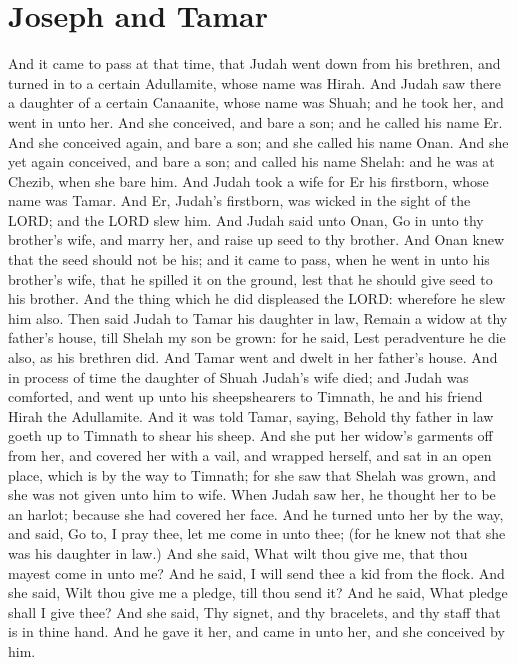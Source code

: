 \section*{Joseph and Tamar}
\begin{biblechapter} %
\verse And it came to pass at that time, that Judah went down from his brethren, and turned in to a certain Adullamite, whose name was Hirah.
\verse And Judah saw there a daughter of a certain Canaanite, whose name was Shuah; and he took her, and went in unto her.
\verse And she conceived, and bare a son; and he called his name Er.
\verse And she conceived again, and bare a son; and she called his name Onan.
\verse And she yet again conceived, and bare a son; and called his name Shelah: and he was at Chezib, when she bare him.
\verse And Judah took a wife for Er his firstborn, whose name was Tamar.
\verse And Er, Judah's firstborn, was wicked in the sight of the LORD; and the LORD slew him.
\verse And Judah said unto Onan, Go in unto thy brother's wife, and marry her, and raise up seed to thy brother.
\verse And Onan knew that the seed should not be his; and it came to pass, when he went in unto his brother's wife, that he spilled it on the ground, lest that he should give seed to his brother.
\verse And the thing which he did displeased the LORD: wherefore he slew him also.
\verse Then said Judah to Tamar his daughter in law, Remain a widow at thy father's house, till Shelah my son be grown: for he said, Lest peradventure he die also, as his brethren did. And Tamar went and dwelt in her father's house.
\verse And in process of time the daughter of Shuah Judah's wife died; and Judah was comforted, and went up unto his sheepshearers to Timnath, he and his friend Hirah the Adullamite.
\verse And it was told Tamar, saying, Behold thy father in law goeth up to Timnath to shear his sheep.
\verse And she put her widow's garments off from her, and covered her with a vail, and wrapped herself, and sat in an open place, which is by the way to Timnath; for she saw that Shelah was grown, and she was not given unto him to wife.
\verse When Judah saw her, he thought her to be an harlot; because she had covered her face.
\verse And he turned unto her by the way, and said, Go to, I pray thee, let me come in unto thee; (for he knew not that she was his daughter in law.) And she said, What wilt thou give me, that thou mayest come in unto me?
\verse And he said, I will send thee a kid from the flock. And she said, Wilt thou give me a pledge, till thou send it?
\verse And he said, What pledge shall I give thee? And she said, Thy signet, and thy bracelets, and thy staff that is in thine hand. And he gave it her, and came in unto her, and she conceived by him.

\end{biblechapter}

